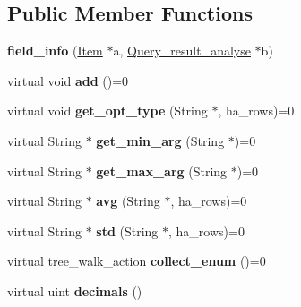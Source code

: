 \subsection*{Public Member Functions}
\begin{DoxyCompactItemize}
\item 
\mbox{\label{classfield__info_a431399ec7c84ae70c06d3f336a021212}} 
{\bfseries field\+\_\+info} (\mbox{\hyperlink{classItem}{Item}} $\ast$a, \mbox{\hyperlink{classQuery__result__analyse}{Query\+\_\+result\+\_\+analyse}} $\ast$b)
\item 
\mbox{\label{classfield__info_a876cb2621333c00c466621cac47e74e3}} 
virtual void {\bfseries add} ()=0
\item 
\mbox{\label{classfield__info_aacc881e670b694f2b83a1ee4d6631155}} 
virtual void {\bfseries get\+\_\+opt\+\_\+type} (String $\ast$, ha\+\_\+rows)=0
\item 
\mbox{\label{classfield__info_a5fe9ff71bec68c4cb25e51b927d46858}} 
virtual String $\ast$ {\bfseries get\+\_\+min\+\_\+arg} (String $\ast$)=0
\item 
\mbox{\label{classfield__info_a443132f713bffc37caac30ff7ab3afc9}} 
virtual String $\ast$ {\bfseries get\+\_\+max\+\_\+arg} (String $\ast$)=0
\item 
\mbox{\label{classfield__info_a7a3616df4b89c2c5e99273b73ca55e89}} 
virtual String $\ast$ {\bfseries avg} (String $\ast$, ha\+\_\+rows)=0
\item 
\mbox{\label{classfield__info_a84f552fb79a92f624329f624abe9c539}} 
virtual String $\ast$ {\bfseries std} (String $\ast$, ha\+\_\+rows)=0
\item 
\mbox{\label{classfield__info_abf0083bbcc232e162fecc8b011278b17}} 
virtual tree\+\_\+walk\+\_\+action {\bfseries collect\+\_\+enum} ()=0
\item 
\mbox{\label{classfield__info_a181bce4596ccdc353a65fc0fbeada647}} 
virtual uint {\bfseries decimals} ()
\end{DoxyCompactItemize}
